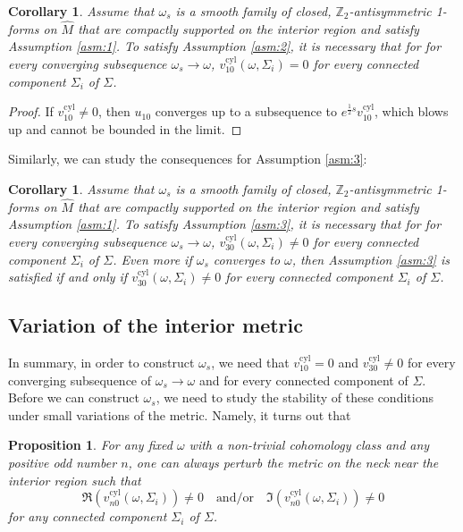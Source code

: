 \documentclass[preprint,12pt]{elsarticle}
\numberwithin{table}{section}
\newtheorem{corollary}[lemma]{Corollary}
\newtheorem{proposition}[lemma]{Proposition}
\newcommand{\Z}{\mathbb{Z}}
\begin{document}
\begin{corollary}
	\label{cor:limit:consequence-A2}
	Assume that $\omega_s$ is a smooth family of closed, $\Z_2$-antisymmetric 1-forms on $\hat{M}$ that are compactly supported on the interior region and satisfy Assumption \ref{asm:1}.
	To satisfy Assumption \ref{asm:2}, it is necessary that for for every converging subsequence $\omega_s \to \omega$, $v^{\mathrm{cyl}}_{10}(\omega, \Sigma_i) = 0$ for every connected component $\Sigma_i$ of $\Sigma$.
\end{corollary}
\begin{proof}
	If $v^{\mathrm{cyl}}_{10} \not= 0$, then $u_{10}$ converges up to a subsequence to $e^{\frac{1}{2} s} v^{\mathrm{cyl}}_{10}$, which blows up and cannot be bounded in the limit.
\end{proof}

Similarly, we can study the consequences for Assumption \ref{asm:3}:
\begin{corollary}
	\label{cor:limit:consequence-A3}
	Assume that $\omega_s$ is a smooth family of closed, $\Z_2$-antisymmetric 1-forms on $\hat{M}$ that are compactly supported on the interior region and satisfy Assumption \ref{asm:1}.
	To satisfy Assumption \ref{asm:3}, it is necessary that for for every converging subsequence $\omega_s \to \omega$, $v^{\mathrm{cyl}}_{30}(\omega, \Sigma_i) \not= 0$ for every connected component $\Sigma_i$ of $\Sigma$.
	Even more if $\omega_s$ converges to $\omega$, then Assumption \ref{asm:3} is satisfied if and only if $v^{\mathrm{cyl}}_{30}(\omega, \Sigma_i) \not= 0$ for every connected component $\Sigma_i$ of $\Sigma$.
\end{corollary}

\subsection{Variation of the interior metric}
In summary, in order to construct $\omega_s$, we need that $v^{\mathrm{cyl}}_{10} = 0$ and $v^{\mathrm{cyl}}_{30}\not = 0$ for every converging subsequence of $\omega_s \to \omega$ and for every connected component of $\Sigma$. Before we can construct $\omega_s$, we need to study the stability of these conditions under small variations of the metric. Namely, it turns out that

\begin{proposition}
	\label{prop:variation-metric-v-cyl}
	For any fixed $\omega$ with a non-trivial cohomology class and any positive odd number $n$, one can always perturb the metric on the neck near the interior region such that 
	$$
	\Re(v^{\mathrm{cyl}}_{n0}(\omega, \Sigma_i)) \not = 0 \quad\text{and/or}\quad \Im(v^{\mathrm{cyl}}_{n0}(\omega, \Sigma_i)) \not = 0
	$$
	for any connected component $\Sigma_i$ of $\Sigma$. 
\end{proposition}
\end{document}
